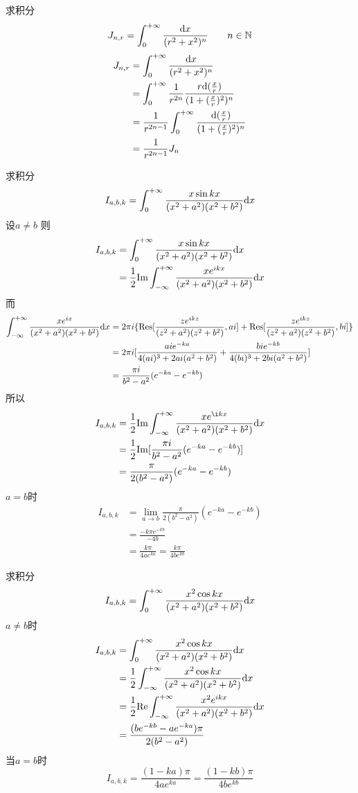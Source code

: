 \begin{homeworkProblem}
    求积分
    \[
    J_{n,r} = \int_0^{+\infty}\frac{\mathrm{d}x}{(r^2+x^2)^n} \qquad n\in\mathbb{N}
    \]
\solution
\[\begin{split}
J_{n,r} &= \int_0^{+\infty}\frac{\mathrm{d}x}{(r^2+x^2)^n}\\
&= \int_0^{+\infty} \frac{1}{r^{2n}}\frac{r\mathrm{d}(\frac{x}{r})}{(1+(\frac{x}{r})^2)^n}\\
&= \frac{1}{r^{2n-1}}\int_0^{+\infty}\frac{\mathrm{d}(\frac{x}{r})}{(1+(\frac{x}{r})^2)^n}\\
&= \frac{1}{r^{2n-1}}J_n
\end{split}\]
\end{homeworkProblem}
\begin{homeworkProblem}
    求积分
    \[
    I_{a,b,k} = \int_0^{+\infty}\frac{x\sin kx}{(x^2+a^2)(x^2+b^2)}\mathrm{d}x
    \]
\solution
设$a\neq b$
则
\[\begin{split}
I_{a,b,k} &= \int_0^{+\infty}\frac{x\sin kx}{(x^2+a^2)(x^2+b^2)}\mathrm{d}x\\
&= \frac{1}{2}\mathrm{Im}\int_{-\infty}^{+\infty}\frac{xe^{ikx}}{(x^2+a^2)(x^2+b^2)}\mathrm{d}x
\end{split}\]
而
\[\begin{split}
\int_{-\infty}^{+\infty}\frac{xe^{ix}}{(x^2+a^2)(x^2+b^2)}\mathrm{d}x
&= 2\pi i\{\mathrm{Res}[\frac{ze^{ikz}}{(z^2+a^2)(z^2+b^2)}, ai] + \mathrm{Res}[\frac{ze^{ikz}}{(z^2+a^2)(z^2+b^2)}, bi]\}\\
&= 2\pi i [\frac{aie^{-ka}}{4(ai)^3+2ai(a^2+b^2)} + \frac{bie^{-kb}}{4(bi)^3+2bi(a^2+b^2)}]\\
&= \frac{\pi i}{b^2-a^2}(e^{-ka}-e^{-kb})
\end{split}\]
所以
\[\begin{split}
I_{a,b,k}
&= \frac{1}{2}\mathrm{Im}\int_{-\infty}^{+\infty}\frac{xe^{\i kx}}{(x^2+a^2)(x^2+b^2)}\dx\\
&= \frac{1}{2}\mathrm{Im}[\frac{\pi i}{b^2-a^2}(e^{-ka}-e^{-kb})]\\
&= \frac{\pi}{2(b^2-a^2)}(e^{-ka}-e^{-kb})
\end{split}\]
$a=b$时
\[\begin{split}
I_{a,b,k}
&= \lim_{a\rightarrow b}\frac{\pi}{2(b^2-a^2)}(e^{-ka}-e^{-kb}) \\
&= \frac{-k\pi e^{-kb}}{-4b} \\
&= \frac{k\pi}{4ae^{ka}} = \frac{k\pi}{4be^{kb}}
\end{split}\]
\end{homeworkProblem}
\begin{homeworkProblem}
    求积分
    \[
    I_{a,b,k} = \int_0^{+\infty}\frac{x^2\cos kx}{(x^2+a^2)(x^2+b^2)}\mathrm{d}x
    \]
\solution
$a\neq b$时
\[\begin{split}
I_{a,b,k} &= \int_0^{+\infty}\frac{x^2\cos kx}{(x^2+a^2)(x^2+b^2)}\mathrm{d}x\\
&= \frac{1}{2}\int_{-\infty}^{+\infty}\frac{x^2\cos kx}{(x^2+a^2)(x^2+b^2)}\mathrm{d}x\\
&= \frac{1}{2}\mathrm{Re}\int_{-\infty}^{+\infty}\frac{x^2e^{ikx}}{(x^2+a^2)(x^2+b^2)}\mathrm{d}x\\
&= \frac{(be^{-kb}-ae^{-ka})\pi}{2(b^2-a^2)}
\end{split}\]
当$a=b$时
\[I_{a,b,k} = \frac{(1-ka)\pi}{4ae^{ka}}= \frac{(1-kb)\pi}{4be^{kb}}\]
\end{homeworkProblem}
\newpage
